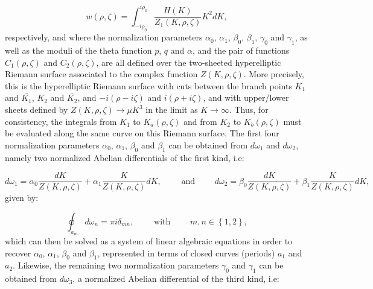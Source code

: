 \documentclass{article}
\begin{document}
\begin{equation}
w \left( \rho, \zeta \right) = \int_{-i \rho_0}^{i \rho_0} \frac{H \left( K \right)}{Z_1 \left( K, \rho, \zeta \right)} K^2 dK,
\end{equation}
respectively, and where the normalization parameters ${\alpha_0}$, ${\alpha_1}$, ${\beta_0}$, ${\beta_1}$, ${\gamma_0}$ and ${\gamma_1}$, as well as the moduli of the theta function $p$, $q$ and ${\alpha}$, and the pair of functions ${C_1 \left( \rho, \zeta \right)}$ and ${C_2 \left( \rho, \zeta \right)}$, are all defined over the two-sheeted hyperelliptic Riemann surface associated to the complex function ${Z \left( K, \rho, \zeta \right)}$. More precisely, this is the hyperelliptic Riemann surface with cuts between the branch points ${K_1}$ and ${\bar{K_1}}$, ${K_2}$ and ${\bar{K_2}}$, and ${-i \left( \rho - i \zeta \right)}$ and ${i \left( \rho + i \zeta \right)}$, and with upper/lower sheets defined by ${Z \left( K, \rho, \zeta \right) \to \mu K^3}$ in the limit as ${K \to \infty}$. Thus, for consistency, the integrals from ${K_1}$ to ${K_a \left( \rho, \zeta \right)}$ and from ${K_2}$ to ${K_b \left( \rho, \zeta \right)}$ must be evaluated along the same curve on this Riemann surface. The first four normalization parameters ${\alpha_0}$, ${\alpha_1}$, ${\beta_0}$ and ${\beta_1}$ can be obtained from ${d \omega_1}$ and ${d \omega_2}$, namely two normalized Abelian differentials of the first kind, i.e:

\begin{equation}
d \omega_1 = \alpha_0 \frac{d K}{Z \left( K, \rho, \zeta \right)} + \alpha_1 \frac{K}{Z \left( K, \rho, \zeta \right)} d K, \qquad \text{ and } \qquad d \omega_2 = \beta_0 \frac{d K}{Z \left( K, \rho, \zeta \right)} + \beta_1 \frac{K}{Z \left( K, \rho, \zeta \right)} d K,
\end{equation}
given by:

\begin{equation}
\oint_{a_m} d \omega_n = \pi i \delta_{m n}, \qquad \text{ with } \qquad m, n \in \left\lbrace 1, 2 \right\rbrace,
\end{equation}
which can then be solved as a system of linear algebraic equations in order to recover ${\alpha_0}$, ${\alpha_1}$, ${\beta_0}$ and ${\beta_1}$, represented in terms of closed curves (periods) ${a_1}$ and ${a_2}$. Likewise, the remaining two normalization parameters ${\gamma_0}$ and ${\gamma_1}$ can be obtained from ${d \omega_3}$, a normalized Abelian differential of the third kind, i.e:
\end{document}

